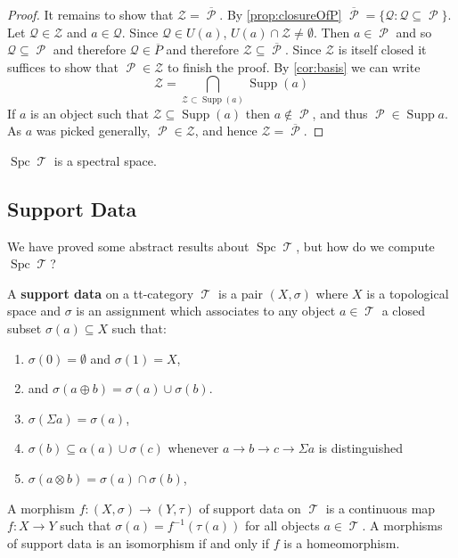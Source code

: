 \documentclass[11pt]{article}
\DeclareMathOperator{\TT}{\mathcal{T}}
\DeclareMathOperator{\cP}{\mathcal{P}}
\DeclareMathOperator{\supp}{Supp}
\DeclareMathOperator{\spc}{Spc}
\begin{document}
\begin{proof}
It remains to show that $\mathcal{Z} = \overline{\cP}$. By \autoref{prop:closureOfP} $\overline{\cP} = \{\mathcal{Q}: \mathcal{Q} \subseteq \cP\}$. Let $\mathcal{Q} \in \mathcal{Z}$ and $a \in \mathcal{Q}$. Since $\mathcal{Q} \in U(a)$, $U(a) \cap \mathcal{Z} \not = \emptyset$. Then $a \in \cP$ and so $\mathcal{Q} \subseteq \cP$ and therefore $\mathcal{Q}\in \overline{P}$ and therefore $\mathcal{Z} \subseteq \overline{\cP}$. Since $\mathcal{Z}$ is itself closed it suffices to show that $\cP \in \mathcal{Z}$ to finish the proof. By \autoref{cor:basis} we can write
\[
	\mathcal{Z} = \bigcap_{\mathcal{Z} \subset \supp(a)}\supp(a)
\]
If $a$ is an object such that $\mathcal{Z} \subseteq \supp(a)$ then $a \not\in \cP$, and thus $\cP \in \supp a$. As $a$ was picked generally, $\cP \in \mathcal{Z}$, and hence $\mathcal{Z} = \overline{\cP}$. 
\end{proof}

\begin{cor}
$\spc\TT$ is a spectral space.
\end{cor}

\subsection{Support Data}
We have proved some abstract results about $\spc \TT$, but how do we compute $\spc \TT$?
\begin{defn}
	A \textbf{support data} on a tt-category $\TT$ is a pair $(X,\sigma)$ where $X$ is a topological space and $\sigma$ is an assignment which associates to any object $a \in \TT$ a closed subset $\sigma(a) \subseteq X$ such that:
\begin{enumerate}[(SD 1)]
	\item $\sigma(0) = \emptyset$ and $\sigma(1) = X$,
	\item and $\sigma(a \oplus b) = \sigma(a) \cup \sigma(b)$.
	\item $\sigma(\Sigma a) = \sigma(a)$,
	\item $\sigma(b) \subseteq \alpha(a) \cup \sigma(c)$ whenever $a \xrightarrow{}b \xrightarrow{} c \xrightarrow{} \Sigma a $ is distinguished
	\item $\sigma(a \otimes b) = \sigma(a) \cap \sigma(b)$,
\end{enumerate}
A morphism $f:(X,\sigma) \to (Y,\tau)$ of support data on $\TT$ is a continuous map $f:X \to Y$ such that $\sigma(a) = f^{-1}(\tau(a))$ for all objects $a \in \TT$. A morphisms of support data is an isomorphism if and only if $f$ is a homeomorphism.
\end{defn}
\end{document}
